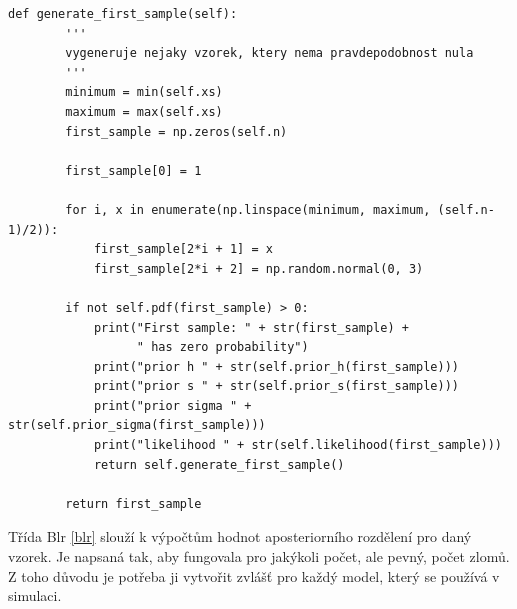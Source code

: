 \documentclass[czech,master,public,dept470,male,cpdeclaration,oneside, python]{diploma}
\begin{document}
\begin{lstlisting}[label=blr, caption=Blr]
    def generate_first_sample(self):
        '''
        vygeneruje nejaky vzorek, ktery nema pravdepodobnost nula
        '''
        minimum = min(self.xs)
        maximum = max(self.xs)
        first_sample = np.zeros(self.n)

        first_sample[0] = 1

        for i, x in enumerate(np.linspace(minimum, maximum, (self.n-1)/2)):
            first_sample[2*i + 1] = x
            first_sample[2*i + 2] = np.random.normal(0, 3)

        if not self.pdf(first_sample) > 0:
            print("First sample: " + str(first_sample) +
                  " has zero probability")
            print("prior h " + str(self.prior_h(first_sample)))
            print("prior s " + str(self.prior_s(first_sample)))
            print("prior sigma " + str(self.prior_sigma(first_sample)))
            print("likelihood " + str(self.likelihood(first_sample)))
            return self.generate_first_sample()

        return first_sample
\end{lstlisting}

Třída Blr \ref{blr} slouží k výpočtům hodnot aposteriorního rozdělení pro daný vzorek. Je napsaná tak, aby fungovala pro jakýkoli počet, ale pevný, počet zlomů. Z toho důvodu je potřeba ji vytvořit zvlášť pro každý model, který se používá v simulaci. 
\end{document}
